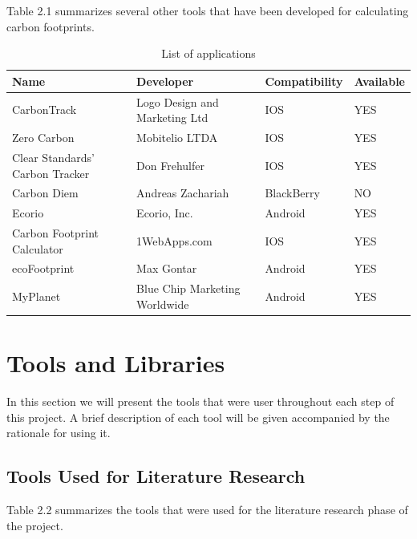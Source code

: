 Table 2.1 summarizes several other tools that have been developed for calculating carbon footprints.

\begin{table}
  \centering
  \begin{tabular}{|p{100px}|p{100px}|p{100px}|p{100px}|}
    \hline
    Name & Developer & Compatibility & Available \\
    \hline
    CarbonTrack & Logo Design and Marketing Ltd & IOS & YES \\
    Zero Carbon & Mobitelio LTDA & IOS & YES \\
    Clear Standards' Carbon Tracker & Don Frehulfer & IOS & YES \\
    Carbon Diem & Andreas Zachariah & BlackBerry & NO \\
    Ecorio & Ecorio, Inc. & Android & YES \\
    Carbon Footprint Calculator & 1WebApps.com & IOS & YES \\
    ecoFootprint & Max Gontar & Android & YES \\
    MyPlanet & Blue Chip Marketing Worldwide & Android & YES \\
    \hline
  \end{tabular}
  \caption{List of applications}\label{carbonCalculators}
\end{table}

\section{Tools and Libraries}

In this section we will present the tools that were user throughout each step of this project. A brief description of each tool will be given accompanied by the rationale for using it.

\subsection{Tools Used for Literature Research}

Table 2.2 summarizes the tools that were used for the literature research phase of the project.

